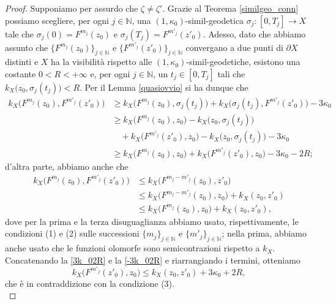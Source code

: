 \begin{proof}
    Supponiamo per assurdo che $\zeta\not=\zeta'$. Grazie al Teorema \ref{similgeo_conn} possiamo scegliere, per ogni $j\in\mathbb{N}$, una $(1,\kappa_0)$-simil-geodetica $\sigma_j:[0,T_j] \longrightarrow X$ tale che $\sigma_j(0)=F^{m_j}(z_0)$ e $\sigma_j(T_j)=F^{m'_j}(z'_0)$. Adesso, dato che abbiamo assunto che $\{F^{m_j}(z_0)\}_{j\in\mathbb{N}}$ e $\{F^{m'_j}(z'_0)\}_{j\in\mathbb{N}}$ convergano a due punti di $\partial X$ distinti e $X$ ha la visibilità rispetto alle $(1,\kappa_0)$-simil-geodetiche, esistono una costante $0<R<+\infty$ e, per ogni $j\in\mathbb{N}$, un $t_j\in[0,T_j]$ tali che $k_X\big(z_0,\sigma_j(t_j)\big)<R$. Per il Lemma \ref{quasiovvio} si ha dunque che
    \begin{equation} \label{3k_02R}
        \begin{aligned}
            k_X\big(F^{m_j}(z_0),F^{m'_j}(z'_0)\big) &\ge k_X\big(F^{m_j}(z_0),\sigma_j(t_j)\big)+k_X\big(\sigma_j(t_j),F^{m'_j}(z'_0)\big)-3\kappa_0\\
            &\ge k_X\big(F^{m_j}(z_0),z_0\big)-k_X\big(z_0,\sigma_j(t_j)\big)\\
            &\quad+k_X\big(F^{m'_j}(z'_0),z_0\big)-k_X\big(z_0,\sigma_j(t_j)\big)-3\kappa_0\\
            &\ge k_X\big(F^{m_j}(z_0),z_0\big)+k_X\big(F^{m'_j}(z'_0),z_0\big)-3\kappa_0-2R;
        \end{aligned}
    \end{equation}
    d'altra parte, abbiamo anche che
    \begin{equation} \label{-3k_02R}
        \begin{aligned}
            k_X\big(F^{m_j}(z_0),F^{m'_j}(z'_0)\big) &\le k_X\big(F^{m_j-m'_j}(z_0),z'_0\big) \\
            &\le k_X\big(F^{m_j-m'_j}(z_0),z_0\big)+k_X(z_0,z'_0) \\
            &\le k_X\big(F^{m_j}(z_0),z_0\big)+k_X(z_0,z'_0),
        \end{aligned}
    \end{equation}
    dove per la prima e la terza disuguaglianza abbiamo usato, rispettivamente, le condizioni (1) e (2) sulle successioni $\{m_j\}_{j\in\mathbb{N}}$ e $\{m'_j\}_{j\in\mathbb{N}}$; nella prima, abbiamo anche usato che le funzioni olomorfe sono semicontrazioni rispetto a $k_X$. Concatenando la \eqref{3k_02R} e la \eqref{-3k_02R} e riarrangiando i termini, otteniamo
    $$k_X\big(F^{m'_j}(z'_0),z_0\big) \le k_X(z_0,z'_0)+3\kappa_0+2R,$$
    che è in contraddizione con la condizione (3).\\


\end{proof}

